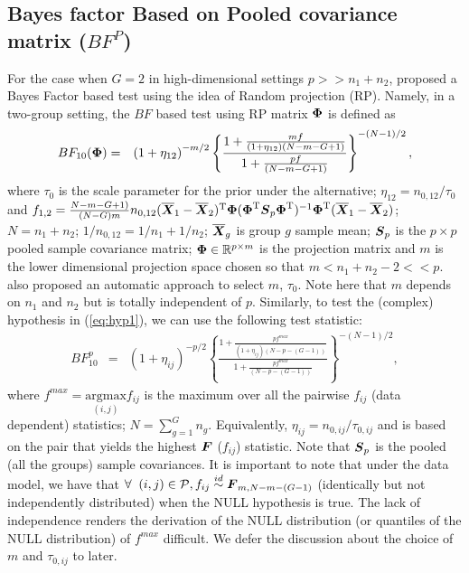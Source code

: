 \documentclass[12pt]{article}
\theoremstyle{plain}%
\theoremstyle{definition}
\def\be{\begin{eqnarray}}
\def\ee{\end{eqnarray}}
\def\trans{^{\rm T}}
\newcommand{\uF}       {\mbox{\boldmath$F$}}
\newcommand{\uR}       {\mbox{\boldmath$R$}}
\newcommand{\uS}       {\mbox{\boldmath$S$}}
\newcommand{\uX}       {\mbox{\boldmath$X$}}
\newcommand{\uPhi}              {\mbox{\boldmath$\Phi$}}
\begin{document}
\subsection{Bayes factor Based on Pooled covariance matrix ($BF^{P}$)} \label{sec:testpl}
For the case when $G = 2$ in high-dimensional settings $p >> n_1+n_2$, \cite{zoh2018powerful} proposed a Bayes Factor  based test using the idea of Random projection (RP). Namely, in a two-group setting, the $BF$ based test using RP matrix $\uPhi$ is defined as
\be
BF_{10}(\uPhi) &=& \left(1 + \eta_{12} \right)^{-m/2} \left\{\frac{  1 + \frac{mf}{(1 + \eta_{12})(N-m-G+1)}}{ 1 + \frac{p f}{(N-m-G+1)}  } \right\}^{-(N-1)/2}, \label{eq:BF1}
\ee
where $\tau_0$ is the scale parameter for the prior under the alternative; $\eta_{12} = n_{0,12}/\tau_{0}$ and $f_{1,2}  = \frac{N-m-G+1)}{(N-G)m} n_{0,12} (\overline{\uX}_1 - \overline{\uX}_2)\trans\uPhi(\uPhi\trans\uS_{p}\uPhi\trans)^{-1}\uPhi\trans(\overline{\uX}_1 - \overline{\uX}_2)$; $N = n_1 + n_2$;
 $ 1/n_{0,12} = 1/n_1 + 1/n_2$; $\overline{\uX}_g$ is group $g$ sample mean; $\uS_p$ is the $p \times p$ pooled sample covariance matrix; $\uPhi \in \mathbb{R}^{p \times m}$ is the projection matrix and $m$ is the lower dimensional projection space chosen so that $m < n_1 +n_2 - 2 << p$. \cite{zoh2018powerful} also proposed an automatic approach to select $m$, $\tau_0$. Note here that $m$ depends on $n_1$ and $n_2$ but is totally independent of $p$.
 Similarly,  to test the (complex) hypothesis in (\ref{eq:hyp1}), we can use the following test statistic:
\be
BF^{p}_{10} &=& \left(1 + \eta_{ij} \right)^{-p/2} \left\{ \frac{  1 + \frac{pf^{max}}{(1 + \eta_{ij})(N-p-(G-1))}}{ 1 + \frac{p f^{max}}{(N-p-(G-1))}  } \right\}^{-(N-1)/2}, \label{eq:BFmax}
\ee
where $f^{max} = \underset{(i,j)}{\mathrm{argmax}}  f_{ij}$ is the maximum over all the pairwise $f_{ij}$ (data dependent) statistics; $N = \sum^{G}_{g=1}n_g$. Equivalently, $\eta_{ij} = n_{0, ij}/\tau_{0,ij}$ and is based on the pair that yields the highest $\uF$ ($f_{ij}$) statistic. Note that $\uS_p$ is the pooled (all the groups) sample covariances. It is important to note that under the data model, we have that $\forall\;\;(i,j) \in \mathcal{P},  f_{ij} \stackrel{id}{\sim} \uF_{m, N - m- (G-1)}$ (identically but not independently distributed) when the NULL hypothesis is true. The lack of independence renders the derivation of the NULL distribution (or quantiles of the NULL distribution) of $f^{max}$ difficult. We defer the discussion about the choice of $m$ and $\tau_{0,ij}$ to later. %
\end{document}
